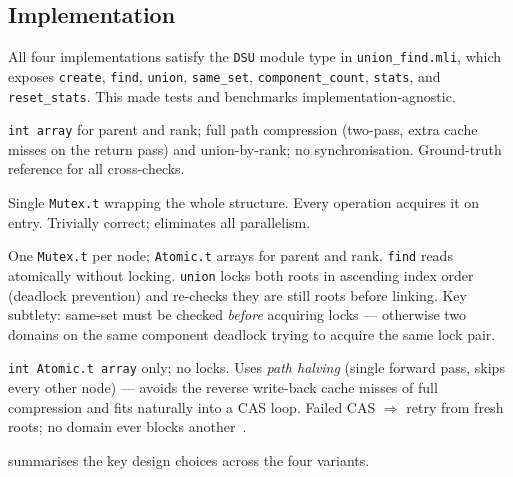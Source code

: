 \documentclass[11pt,a4paper]{article}
\begin{document}
\subsection{Implementation}

All four implementations satisfy the \texttt{DSU} module type in
\texttt{union\_find.mli}, which exposes \texttt{create}, \texttt{find},
\texttt{union}, \texttt{same\_set}, \texttt{component\_count}, \texttt{stats},
and \texttt{reset\_stats}.  This made tests and benchmarks implementation-agnostic.

\begin{description}[leftmargin=1.5em,labelindent=0em]
  \item[\texttt{sequential\_union\_find.ml}] \texttt{int array} for parent and
    rank; full path compression (two-pass, extra cache misses on the return
    pass) and union-by-rank; no synchronisation.  Ground-truth reference for
    all cross-checks.

  \item[\texttt{mutex\_union\_find.ml}] Single \texttt{Mutex.t} wrapping the
    whole structure.  Every operation acquires it on entry.  Trivially correct;
    eliminates all parallelism.

  \item[\texttt{node\_lock\_union\_find.ml}] One \texttt{Mutex.t} per node;
    \texttt{Atomic.t} arrays for parent and rank.  \texttt{find} reads
    atomically without locking.  \texttt{union} locks both roots in ascending
    index order (deadlock prevention) and re-checks they are still roots before
    linking.  Key subtlety: same-set must be checked \emph{before} acquiring
    locks --- otherwise two domains on the same component deadlock trying to
    acquire the same lock pair.

  \item[\texttt{cas\_union\_find.ml}] \texttt{int Atomic.t array} only; no
    locks.  Uses \emph{path halving} (single forward pass, skips every other
    node) --- avoids the reverse write-back cache misses of full compression and
    fits naturally into a CAS loop.  Failed CAS $\Rightarrow$ retry from fresh
    roots; no domain ever blocks another~\cite{AlistarhFK19}.
\end{description}

 summarises the key design choices across the four variants.
\end{document}
